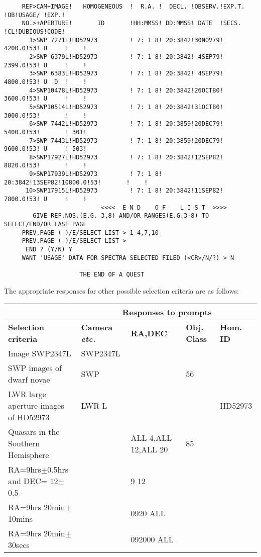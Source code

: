 \begin{footnotesize}
\begin{verbatim}
     REF>CAM+IMAGE!   HOMOGENEOUS  !  R.A. !  DECL. !OBSERV.!EXP.T. !OB!USAGE/ !EXP.!
     NO.>+APERTURE!       ID       !HH:MMSS! DD:MMSS! DATE  !SECS.  !CL!DUBIOUS!CODE!
       1>SWP 7271L!HD52973         ! 7: 1 8! 20:3842!30NOV79! 4200.0!53! U     !    !
       2>SWP 6379L!HD52973         ! 7: 1 8! 20:3842! 4SEP79! 2399.0!53! U     !    !
       3>SWP 6383L!HD52973         ! 7: 1 8! 20:3842! 4SEP79! 4800.0!53! U  D  !    !
       4>SWP10478L!HD52973         ! 7: 1 8! 20:3842!26OCT80! 3600.0!53! U     !    !
       5>SWP10514L!HD52973         ! 7: 1 8! 20:3842!31OCT80! 3000.0!53!       !    !
       6>SWP 7442L!HD52973         ! 7: 1 8! 20:3859!20DEC79! 5400.0!53!       ! 301!
       7>SWP 7443L!HD52973         ! 7: 1 8! 20:3859!20DEC79! 9600.0!53! U     ! 503!
       8>SWP17927L!HD52973         ! 7: 1 8! 20:3842!12SEP82! 8820.0!53!       !    !
       9>SWP17939L!HD52973         ! 7: 1 8! 20:3842!13SEP82!10800.0!53!       !    !
      10>SWP17915L!HD52973         ! 7: 1 8! 20:3842!11SEP82! 7800.0!53! U     !    !
                           <<<<  E N D    O F    L I S T  >>>>                       
        GIVE REF.NOS.(E.G. 3,8) AND/OR RANGES(E.G.3-8) TO SELECT/END/OR LAST PAGE    
     PREV.PAGE (-)/E/SELECT LIST > 1-4,7,10
     PREV.PAGE (-)/E/SELECT LIST > 
      END ? (Y/N) Y
     WANT 'USAGE' DATA FOR SPECTRA SELECTED FILED (<CR>/N/?) > N
  
                     THE END OF A QUEST
\end{verbatim}
\end{footnotesize}
\normalsize
The appropriate responses for other possible selection criteria are as follows:

\footnotesize
\begin{center}
\begin{tabular}{|l|l|l|l|l|} \hline
\footnotesize
{}&\multicolumn{4}{c|}{\bf Responses to prompts} \\ \hline
{\bf Selection criteria}&{\bf Camera {\it etc.}}&{\bf RA,DEC}&{\bf Obj. Class}
&{\bf Hom. ID}\\ \hline
Image SWP2347L &SWP2347L&&&\\
SWP images of dwarf novae &SWP&&56&\\
LWR large aperture images of HD52973&LWR L&&&HD52973\\
Quasars in the Southern Hemisphere&&ALL 4,ALL 12,ALL 20&85&\\
RA=9hrs$\pm$0.5hrs and DEC= 12$\pm$0.5&&9 12 &&\\ 
RA=9hrs 20min$\pm$10mins &&0920 ALL &&\\ 
RA=9hrs 20min$\pm$30secs &&092000 ALL &&\\ \hline
\end{tabular}
\end{center}

